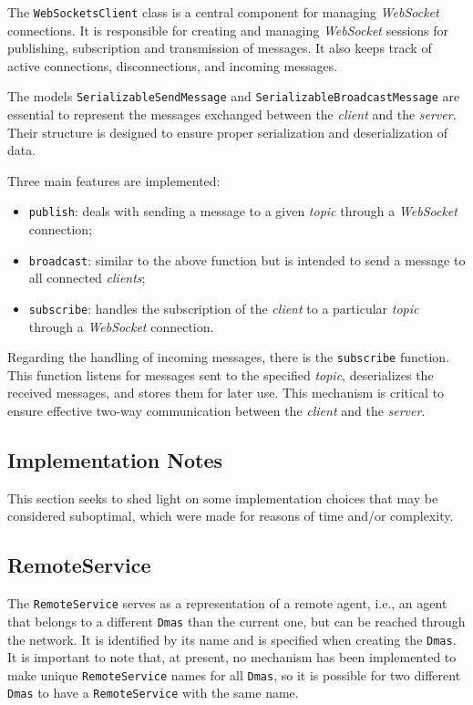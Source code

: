 {{The \texttt{WebSocketsClient} class is a central component for managing \textit{WebSocket} connections.
It is responsible for creating and managing \textit{WebSocket} sessions for publishing,
subscription and transmission of messages. It also keeps track of active connections, disconnections, and incoming messages.

The models \texttt{SerializableSendMessage} and \texttt{SerializableBroadcastMessage} are essential to represent the messages exchanged between the \textit{client} and
the \textit{server}. Their structure is designed to ensure proper serialization and deserialization of data.

Three main features are implemented:
\begin{itemize}
    \item \texttt{publish}: deals with sending a message to a given \textit{topic} through a \textit{WebSocket} connection;
    \item \texttt{broadcast}: similar to the above function but is intended to send a message to all connected \textit{clients};
    \item \texttt{subscribe}: handles the subscription of the \textit{client} to a particular \textit{topic} through a \textit{WebSocket} connection.
\end{itemize}
Regarding the handling of incoming messages, there is the \texttt{subscribe} function.
This function listens for messages sent to the specified \textit{topic}, deserializes the received messages, and stores them for later use.
This mechanism is critical to ensure effective two-way communication between the \textit{client} and the \textit{server}.

\subsection{Implementation Notes}
This section seeks to shed light on some implementation choices that may be considered suboptimal, which were made for reasons of time and/or complexity.

\subsection{RemoteService}
The \texttt{RemoteService} serves as a representation of a remote agent, i.e., an agent that belongs to a different \texttt{Dmas} than the current one, but can be reached through the network.
It is identified by its name and is specified when creating the \texttt{Dmas}. It is important to note that, at present, no mechanism has been implemented to make
unique \texttt{RemoteService} names for all \texttt{Dmas}, so it is possible for two different \texttt{Dmas} to have a \texttt{RemoteService} with the same name.

}}
